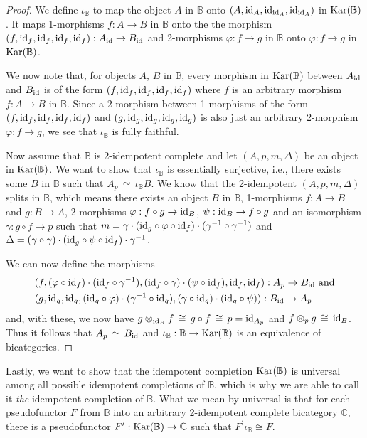\documentclass[12pt,oneside,reqno,a4paper]{article}
\theoremstyle{definition}
\newcommand{\Kar}[1]{\textup{Kar}(#1)}
\renewcommand{\phi}{\varphi}
\newcommand{\iso}{\,\cong\,}
\renewcommand{\equiv}{\,\simeq\,}
\newcommand{\id}{\textup{id}}
\newcommand{\bB}{\mathbb{B}}
\newcommand{\bC}{\mathbb{C}}
\begin{document}
\begin{proof}
We define $\iota_\bB$ to map the object $A$ in $\bB$ onto $(A,\id_A,\id_{\id_A},\id_{\id_A})$ in $\Kar{\bB}$. It maps 1-morphisms $f:A\to B$ in $\bB$ onto the the morphism $(f,\id_f,\id_f,\id_f,\id_f):A_{\id}\to B_{\id}$ and 2-morphisms $\phi:f\to g$ in $\bB$ onto $\phi:f\to g$ in $\Kar{\bB}$.

We now note that, for objects $A$, $B$ in $\bB$, every morphism in $\Kar{\bB}$ between $A_{\id}$ and $B_{\id}$ is of the form $(f,\id_f,\id_f,\id_f,\id_f)$ where $f$ is an arbitrary morphism $f:A\to B$ in $\bB$. Since a 2-morphism between 1-morphisms of the form  $(f,\id_f,\id_f,\id_f,\id_f)$ and $(g,\id_g,\id_g,\id_g,\id_g)$ is also just an arbitrary 2-morphism $\varphi:f\to g$, we see that $\iota_\bB$ is fully faithful.

Now assume that $\bB$ is 2-idempotent complete and let $(A,p,m,\Delta)$ be an object in $\Kar{\bB}$. We want to show that $\iota_\bB$ is essentially surjective, i.e., there exists some $B$ in $\bB$ such that $A_p\equiv \iota_\bB B$. We know that the 2-idempotent $(A,p,m,\Delta)$ splits in $\bB$, which means there exists an object $B$ in $\bB$, 1-morphisms $f:A\to B$ and $g:B\to A$, 2-morphisms $\varphi:f\circ g\to \id_B$, $\psi:\id_B \to f\circ g$ and an isomorphism $\gamma:g\circ f\to p$ such that $m=\gamma\cdot(\id_g \circ \varphi \circ \id_f)\cdot(\gamma^{-1}\circ\gamma^{-1})$ and $\Delta=(\gamma\circ\gamma)\cdot(\id_g \circ \psi \circ \id_f)\cdot\gamma^{-1}$.

We can now define the morphisms
\begin{align*}
& (f,(\phi\circ\id_f)\cdot(\id_f\circ \gamma^{-1}),(\id_f\circ\gamma)\cdot(\psi\circ\id_f),\id_f,\id_f):A_p\to B_{\id} \text{ and} \\
& (g,\id_g,\id_g,(\id_g\circ\phi)\cdot(\gamma^{-1}\circ\id_g),(\gamma\circ\id_g)\cdot(\id_g\circ\psi)):B_{\id}\to A_p
\end{align*}
and, with these, we now have $g\otimes_{\id_B} f\iso g\circ f\iso p=\id_{A_p}$ and $f\otimes_p g\iso\id_B$. Thus it follows that $A_p\equiv B_{\id}$ and $\iota_\bB:\bB\to\Kar{\bB}$ is an equivalence of bicategories.
\end{proof}

Lastly, we want to show that the idempotent completion $\Kar{\bB}$ is universal among all possible idempotent completions of $\bB$, which is why we are able to call it \textit{the} idempotent completion of $\bB$. What we mean by universal is that for each pseudofunctor $F$ from $\bB$ into an arbitrary 2-idempotent complete bicategory $\bC$, there is a pseudofunctor $F^\prime:\Kar{\bB}\to\bC$ such that $F^\prime\iota_\bB\cong F$.
\end{document}
